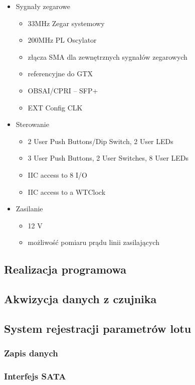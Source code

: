 \documentclass[a4paper,11pt,oneside]{article}  %
\begin{document}
\begin{itemize}
\item Sygnały zegarowe
	\begin{itemize}
	\item 33MHz Zegar systemowy
	\item 200MHz PL Oscylator
	\item złącza SMA dla zewnętrznych sygnałów zegarowych
	\item referencyjne do GTX 
	\item OBSAI/CPRI – SFP+ 
	\item EXT Config CLK
	\end{itemize}

\item Sterowanie
	\begin{itemize}
	\item 2 User Push Buttons/Dip Switch, 2 User LEDs
	\item 3 User Push Buttons, 2 User Switches, 8 User LEDs
	\item IIC access to 8 I/O
	\item IIC access to a WTClock
	\end{itemize}

\item Zasilanie
	\begin{itemize}
	\item 12 V 
	\item możliwość pomiaru prądu linii zasilających
	\end{itemize}
\end{itemize}

\subsection{Realizacja programowa}

\subsection{Akwizycja danych z czujnika}

\subsection{System rejestracji parametrów lotu}

\subsubsection{Zapis danych}

\subsubsection{Interfejs SATA}
\end{document}

